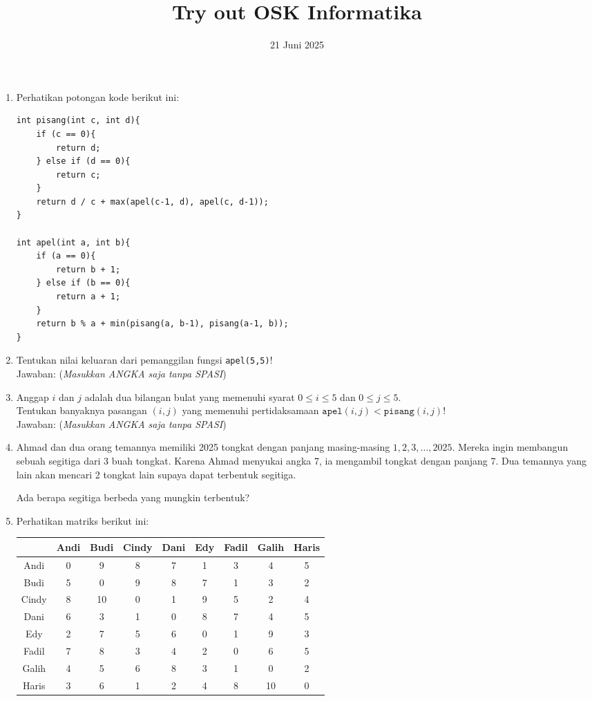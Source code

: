 \documentclass[a4paper,11pt]{article}
\title{Try out OSK Informatika}
\author{21 Juni 2025}
\date{}
\begin{document}
\maketitle
\begin{enumerate}
  \item[] Perhatikan potongan kode berikut ini:
\begin{verbatim}
int pisang(int c, int d){
    if (c == 0){
        return d;
    } else if (d == 0){
        return c;
    }
    return d / c + max(apel(c-1, d), apel(c, d-1));
}

int apel(int a, int b){
    if (a == 0){
        return b + 1;
    } else if (b == 0){
        return a + 1;
    }
    return b % a + min(pisang(a, b-1), pisang(a-1, b));
}
\end{verbatim}
\setcounter{enumi}{0}
\item Tentukan nilai keluaran dari pemanggilan fungsi \texttt{apel(5,5)}!\\
  Jawaban: \underline{\hspace{5cm}} \quad (\textit{Masukkan ANGKA saja tanpa SPASI})

  \item Anggap $i$ dan $j$ adalah dua bilangan bulat yang memenuhi syarat $0 \le i \le 5$ dan $0 \le j \le 5$.\\
  Tentukan banyaknya pasangan $(i,j)$ yang memenuhi pertidaksamaan $\texttt{apel}(i,j) < \texttt{pisang}(i,j)$!\\
  Jawaban: \underline{\hspace{5cm}} \quad (\textit{Masukkan ANGKA saja tanpa SPASI})
  \item Ahmad dan dua orang temannya memiliki 2025 tongkat dengan panjang masing-masing $1, 2, 3, \ldots, 2025$.  
Mereka ingin membangun sebuah segitiga dari 3 buah tongkat. Karena Ahmad menyukai angka 7,  
ia mengambil tongkat dengan panjang 7. Dua temannya yang lain akan mencari 2 tongkat lain  
supaya dapat terbentuk segitiga.  

Ada berapa segitiga berbeda yang mungkin terbentuk?

  \item Perhatikan matriks berikut ini:
  \begin{center}
\renewcommand{\arraystretch}{1.2}
  \begin{tabular}{|c|c c c c c c c c|}
\hline
        & Andi & Budi & Cindy & Dani & Edy & Fadil & Galih & Haris \\
\hline
Andi   & 0 & 9 & 8 & 7 & 1 & 3 & 4 & 5 \\
Budi  & 5 & 0 & 9 & 8 & 7 & 1 & 3 & 2 \\
Cindy & 8 & 10 & 0 & 1 & 9 & 5 & 2 & 4 \\
Dani & 6 & 3 & 1 & 0 & 8 & 7 & 4 & 5 \\
Edy  & 2 & 7 & 5 & 6 & 0 & 1 & 9 & 3 \\
Fadil & 7 & 8 & 3 & 4 & 2 & 0 & 6 & 5 \\
Galih  & 4 & 5 & 6 & 8 & 3 & 1 & 0 & 2 \\
Haris & 3 & 6 & 1 & 2 & 4 & 8 & 10 & 0 \\
\hline
\end{tabular}
\end{center}


\end{enumerate}
\end{document}
